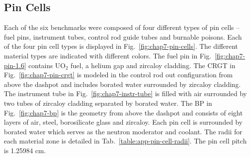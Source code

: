 \subsection{Pin Cells}
\label{subsec:chap7-pin-cells}

Each of the six benchmarks were composed of four different types of pin cells -- fuel pins, instrument tubes, control rod guide tubes and burnable poisons. Each of the four pin cell types is displayed in Fig.~\ref{fig:chap7-pin-cells}. The different material types are indicated with different colors. The fuel pin in Fig.~\ref{fig:chap7-pin-1.6} contains UO$_2$ fuel, a helium gap and zircaloy cladding. The \ac{CRGT} in Fig.~\ref{fig:chap7-pin-crgt} is modeled in the control rod out configuration from above the dashpot and includes borated water surrounded by zircaloy cladding. The instrument tube in Fig.~\ref{fig:chap7-instr-tube} is filled with air surrounded by two tubes of zircaloy cladding separated by borated water. The \ac{BP} in Fig.~\ref{fig:chap7-bp} is the geometry from above the dashpot and consists of eight layers of air, steel, borosilicate glass and zircaloy. Each pin cell is surrounded by borated water which serves as the neutron moderator and coolant. The radii for each material zone is detailed in Tab.~\ref{table:app-pin-cell-radii}. The pin cell pitch is 1.25984 cm.


